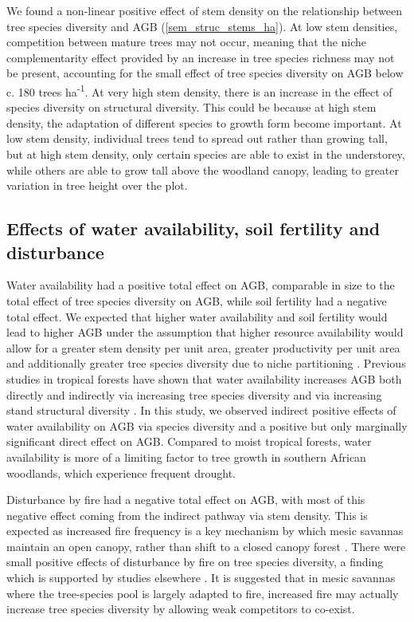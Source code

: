 \documentclass[11pt,a4paper]{article}
\begin{document}
We found a non-linear positive effect of stem density on the relationship between tree species diversity and AGB (\autoref{sem_struc_stems_ha}). At low stem densities, competition between mature trees may not occur, meaning that the niche complementarity effect provided by an increase in tree species richness may not be present, accounting for the small effect of tree species diversity on AGB below c. 180 trees ha\textsuperscript{-1}. At very high stem density, there is an increase in the effect of species diversity on structural diversity. This could be because at high stem density, the adaptation of different species to growth form become important. At low stem density, individual trees tend to spread out rather than growing tall, but at high stem density, only certain species are able to exist in the understorey, while others are able to grow tall above the woodland canopy, leading to greater variation in tree height over the plot.


\subsection{Effects of water availability, soil fertility and disturbance}

Water availability had a positive total effect on AGB, comparable in size to the total effect of tree species diversity on AGB, while soil fertility had a negative total effect. We expected that higher water availability and soil fertility would lead to higher AGB under the assumption that higher resource availability would allow for a greater stem density per unit area, greater productivity per unit area and additionally greater tree species diversity due to niche partitioning \citep{Kraaij2006, Shirima2015}. Previous studies in tropical forests have shown that water availability increases AGB both directly and indirectly via increasing tree species diversity and via increasing stand structural diversity \citep{Ali2019a, Ali2019b, Poorter2017}. In this study, we observed indirect positive effects of water availability on AGB via species diversity and a positive but only marginally significant direct effect on AGB. Compared to moist tropical forests, water availability is more of a limiting factor to tree growth in southern African woodlands, which experience frequent drought. 

Disturbance by fire had a negative total effect on AGB, with most of this negative effect coming from the indirect pathway via stem density. This is expected as increased fire frequency is a key mechanism by which mesic savannas maintain an open canopy, rather than shift to a closed canopy forest \citep{Staver2011}. There were small positive effects of disturbance by fire on tree species diversity, a finding which is supported by studies elsewhere \citep{Durigan2020, Staver2009}. It is suggested that in mesic savannas where the tree-species pool is largely adapted to fire, increased fire may actually increase tree species diversity by allowing weak competitors to co-exist. 
\end{document}
